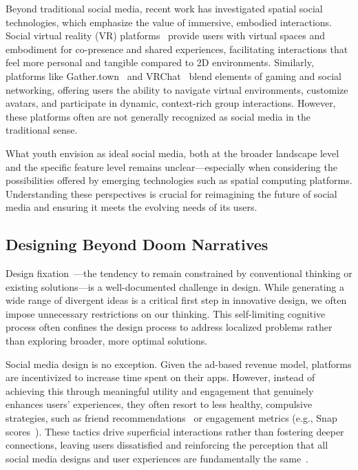 Beyond traditional social media, recent work has investigated spatial social technologies, which emphasize the value of immersive, embodied interactions. Social virtual reality (VR) platforms~\cite{Zamanifard-2023-SurpriseBirthdayDistance-n, Freeman-2024-MyAudiences-u, Freeman-2020-MyBodyReality-l, Zamanifard-2019-TogethernessCraveRelationships-s} provide users with virtual spaces and embodiment for co-presence and shared experiences, facilitating interactions that feel more personal and tangible compared to 2D environments. Similarly, platforms like Gather.town~\cite{duarte2023experience,tu2022meetings} and VRChat~\cite{chen2024d,deighan2023social,rzeszewski2024social} blend elements of gaming and social networking, offering users the ability to navigate virtual environments, customize avatars, and participate in dynamic, context-rich group interactions. However, these platforms often are not generally recognized as social media in the traditional sense.

What youth envision as ideal social media, both at the broader landscape level and the specific feature level remains unclear---especially when considering the possibilities offered by emerging technologies such as spatial computing platforms. Understanding these perspectives is crucial for reimagining the future of social media and ensuring it meets the evolving needs of its users.


\subsection{Designing Beyond Doom Narratives}
 Design fixation~\cite{jansson1991design}---the tendency to remain constrained by conventional thinking or existing solutions---is a well-documented challenge in design. While generating a wide range of divergent ideas is a critical first step in innovative design, we often impose unnecessary restrictions on our thinking. This self-limiting cognitive process often confines the design process to address localized problems rather than exploring broader, more optimal solutions.

Social media design is no exception. Given the ad-based revenue model, platforms are incentivized to increase time spent on their apps. However, instead of achieving this through meaningful utility and engagement that genuinely enhances users' experiences, they often resort to less healthy, compulsive strategies, such as friend recommendations~\cite{HinikerKim-2024-SharingDesign-x} or engagement metrics (e.g., Snap scores~\cite{rozgonjuk2021comparing}). These tactics drive superficial interactions rather than fostering deeper connections, leaving users dissatisfied and reinforcing the perception that all social media designs and user experiences are fundamentally the same~\cite{Sundaram-Other-SocialMediaSame-g, Pardes-2020-SocialMediaSame-p}.

